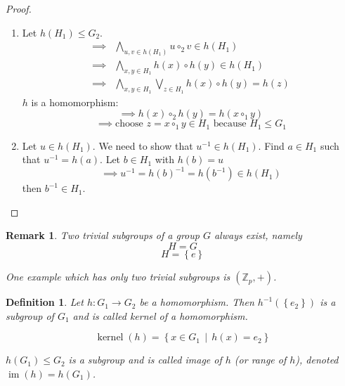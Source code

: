 \documentclass[a4paper,landscape,twocolumn]{article}
\newcommand\set[1]{\left\{#1\right\}}
\newcommand\setdef[2]{\left\{#1\,\middle|\,#2\right\}}
\newtheorem{defi}{Definition}[section]
\newtheorem{rem}{Remark}[section]
\begin{document}
\begin{proof}
  \begin{enumerate}
    \item
      Let $h(H_1) \leq G_2$.
      \begin{align*}
        \implies & \bigwedge_{u,v \in h(H_1)} u \circ_2 v \in h(H_1) \\
        \implies & \bigwedge_{x,y \in H_1} h(x) \circ h(y) \in h(H_1) \\
        \implies & \bigwedge_{x,y \in H_1} \bigvee_{z \in H_1} h(x) \circ h(y) = h(z)
      \end{align*}
      $h$ is a homomorphism:
      \[ \implies h(x) \circ_2 h(y) = h(x \circ_1 y) \]
      \[ \implies \text{choose } z = x \circ_1 y \in H_1 \text{ because } H_1 \leq G_1 \]
    \item
      Let $u \in h(H_1)$. We need to show that $u^{-1} \in h(H_1)$.
      Find $a \in H_1$ such that $u^{-1} = h(a)$.
      Let $b \in H_1$ with $h(b) = u$
      \[ \implies u^{-1} = h(b)^{-1} = h(b^{-1}) \in h(H_1) \]
      then $b^{-1} \in H_1$.
  \end{enumerate}
\end{proof}

\begin{rem}
  Two \emph{trivial subgroups} of a group $G$ always exist, namely
  \[ H = G \]
  \[ H = \set{e} \]

  One example which has only two trivial subgroups is $(\mathbb Z_p, +)$.
\end{rem}

\begin{defi}
  Let $h: G_1 \rightarrow G_2$ be a homomorphism.
  Then $h^{-1}(\set{e_2})$ is a subgroup of $G_1$
  and is called \emph{kernel} of a homomorphism.

  \[ \operatorname{kernel}(h) = \setdef{x \in G_1}{h(x) = e_2} \]

  $h(G_1) \leq G_2$ is a subgroup and is called \emph{image of $h$} (or \emph{range of $h$}),
  denoted $\operatorname{im}(h) = h(G_1)$.
\end{defi}
\end{document}
